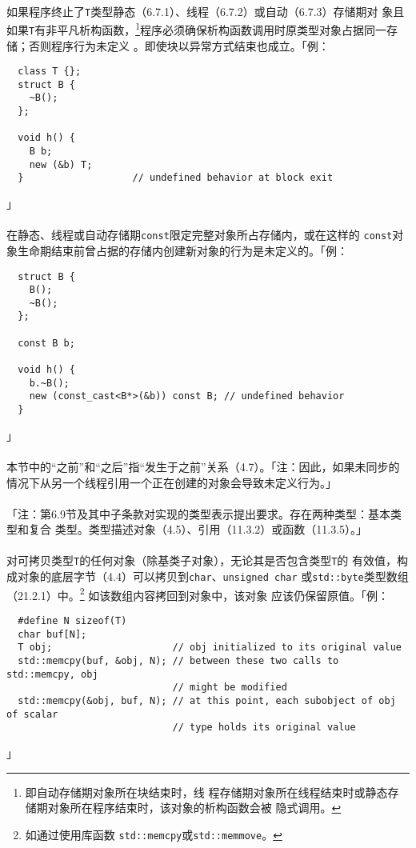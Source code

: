 \paragraph{}
如果程序终止了\texttt{T}类型静态（6.7.1）、线程（6.7.2）或自动（6.7.3）存储期对
象且如果\texttt{T}有非平凡析构函数，\footnote{即自动存储期对象所在块结束时，线
程存储期对象所在线程结束时或静态存储期对象所在程序结束时，该对象的析构函数会被
隐式调用。}程序必须确保析构函数调用时原类型对象占据同一存储；否则程序行为未定义
。即使块以异常方式结束也成立。「例：
\begin{lstlisting}
  class T {};
  struct B {
    ~B();
  };

  void h() {
    B b;
    new (&b) T;
  }                   // undefined behavior at block exit
\end{lstlisting}」

\paragraph{}
在静态、线程或自动存储期\texttt{const}限定完整对象所占存储内，或在这样的
\texttt{const}对象生命期结束前曾占据的存储内创建新对象的行为是未定义的。「例：
\begin{lstlisting}
  struct B {
    B();
    ~B();
  };

  const B b;

  void h() {
    b.~B();
    new (const_cast<B*>(&b)) const B; // undefined behavior
  }
\end{lstlisting}」

\paragraph{}
本节中的``之前''和``之后''指``发生于之前''关系（4.7）。「注：因此，如果未同步的
情况下从另一个线程引用一个正在创建的对象会导致未定义行为。」


\paragraph{}
「注：第6.9节及其中子条款对实现的类型表示提出要求。存在两种类型：基本类型和复合
类型。类型描述对象（4.5）、引用（11.3.2）或函数（11.3.5）。」

\paragraph{}
对可拷贝类型\texttt{T}的任何对象（除基类子对象），无论其是否包含类型\texttt{T}的
有效值，构成对象的底层字节（4.4）可以拷贝到\texttt{char}、\texttt{unsigned char}
或\texttt{std::byte}类型数组（21.2.1）中。\footnote{如通过使用库函数
\texttt{std::memcpy}或\texttt{std::memmove}。} 如该数组内容拷回到对象中，该对象
应该仍保留原值。「例：
\begin{lstlisting}
  #define N sizeof(T)
  char buf[N];
  T obj;                     // obj initialized to its original value
  std::memcpy(buf, &obj, N); // between these two calls to std::memcpy, obj
                             // might be modified
  std::memcpy(&obj, buf, N); // at this point, each subobject of obj of scalar
                             // type holds its original value
\end{lstlisting}」

